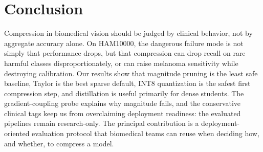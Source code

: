 \documentclass{article}
\begin{document}
\section{Conclusion}
Compression in biomedical vision should be judged by clinical behavior, not by aggregate accuracy alone. On HAM10000, the dangerous failure mode is not simply that performance drops, but that compression can drop recall on rare harmful classes disproportionately, or can raise melanoma sensitivity while destroying calibration. Our results show that magnitude pruning is the least safe baseline, Taylor is the best sparse default, INT8 quantization is the safest first compression step, and distillation is useful primarily for dense students. The gradient-coupling probe explains why magnitude fails, and the conservative clinical tags keep us from overclaiming deployment readiness: the evaluated pipelines remain research-only. The principal contribution is a deployment-oriented evaluation protocol that biomedical teams can reuse when deciding how, and whether, to compress a model.

\clearpage


\end{document}
